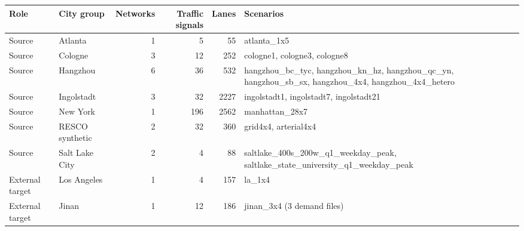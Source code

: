 \begin{tabular}{llrrrl}
\toprule
Role & City group & Networks & Traffic signals & Lanes & Scenarios \\
\midrule
Source & Atlanta & 1 & 5 & 55 & atlanta\_1x5 \\
Source & Cologne & 3 & 12 & 252 & cologne1, cologne3, cologne8 \\
Source & Hangzhou & 6 & 36 & 532 & hangzhou\_bc\_tyc, hangzhou\_kn\_hz, hangzhou\_qc\_yn, hangzhou\_sb\_sx, hangzhou\_4x4, hangzhou\_4x4\_hetero \\
Source & Ingolstadt & 3 & 32 & 2227 & ingolstadt1, ingolstadt7, ingolstadt21 \\
Source & New York & 1 & 196 & 2562 & manhattan\_28x7 \\
Source & RESCO synthetic & 2 & 32 & 360 & grid4x4, arterial4x4 \\
Source & Salt Lake City & 2 & 4 & 88 & saltlake\_400s\_200w\_q1\_weekday\_peak, saltlake\_state\_university\_q1\_weekday\_peak \\
External target & Los Angeles & 1 & 4 & 157 & la\_1x4 \\
External target & Jinan & 1 & 12 & 186 & jinan\_3x4 (3 demand files) \\
\bottomrule
\end{tabular}
